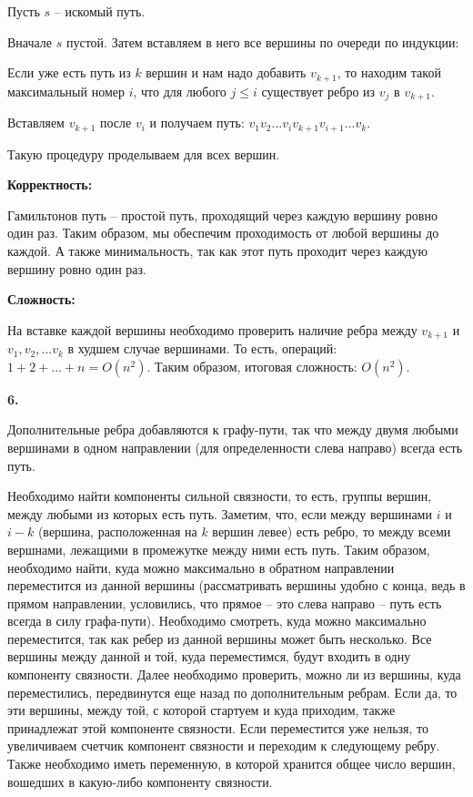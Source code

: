 \documentclass[12pt]{extreport}
\begin{document}
Пусть $s$ -- искомый путь.

Вначале $s$ пустой. Затем вставляем в него все вершины по очереди по индукции:

Если уже есть путь из $k$ вершин и нам надо добавить $v_{k+1}$, то находим такой максимальный номер $i$, что для любого $j\leq i$ существует ребро из $v_j$ в $v_{k+1}$. 

Вставляем $v_{k+1}$ после $v_i$ и получаем путь: $v_1v_2...v_i v_{k+1} v_{i+1}...v_{k}$. 

Такую процедуру проделываем для всех вершин. 

\bigskip 
{\bf Корректность:}

Гамильтонов путь -- простой путь, проходящий через каждую вершину ровно один раз. Таким образом, мы обеспечим проходимость от любой вершины до каждой. А также минимальность, так как этот путь проходит через каждую вершину ровно один раз. 

\bigskip 
{\bf Сложность:} 

На вставке каждой вершины необходимо проверить наличие ребра между $v_{k+1}$ и $v_1, v_2, ... v_k $ в худшем случае вершинами. То есть, операций: $1+2+...+n = O(n^2)$. Таким образом, итоговая сложность: $O(n^2)$.

\bigskip 
{\bf 6.} 

Дополнительные ребра добавляются к графу-пути, так что между двумя любыми вершинами в одном направлении (для определенности слева направо) всегда есть путь. 

Необходимо найти компоненты сильной связности, то есть, группы вершин, между любыми из которых есть путь. Заметим, что, если между вершинами $i$ и $i-k$ (вершина, расположенная на $k$  вершин левее) есть ребро, то между всеми вершнами, лежащими в промежутке между ними есть путь. Таким образом, необходимо найти, куда можно максимально в обратном направлении переместится из данной вершины (рассматривать вершины удобно с конца, ведь в прямом направлении, условились, что прямое -- это слева направо -- путь есть всегда в силу графа-пути). Необходимо смотреть, куда можно максимально переместится, так как ребер из данной вершины может быть несколько. Все вершины между данной и той, куда переместимся, будут входить в одну компоненту связности. Далее необходимо проверить, можно ли из вершины, куда переместились, передвинутся еще назад по дополнительным ребрам. Если да, то эти вершины, между той, с которой стартуем и куда приходим, также принадлежат этой компоненте связности. Если переместится уже нельзя, то увеличиваем счетчик компонент связности и переходим к следующему ребру. Также необходимо иметь переменную, в которой хранится общее число вершин, вошедших в какую-либо компоненту связности. 
\end{document}
